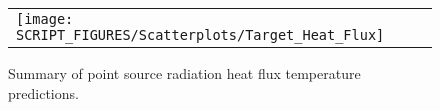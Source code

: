 \begin{figure}[!ht]
\begin{center}
\begin{tabular}{l}
\texttt{[image: SCRIPT\_FIGURES/Scatterplots/Target\_Heat\_Flux]}
\end{tabular}
\end{center}
\caption[Summary of point source radiation heat flux predictions]
{Summary of point source radiation heat flux temperature predictions.}
\label{Heat_Flux_Point_Source_Summary}
\end{figure}
